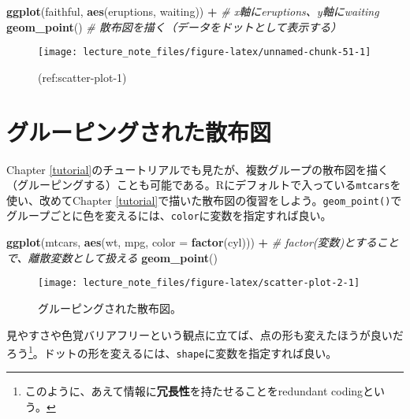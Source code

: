 \documentclass[]{book}
\newenvironment{Shaded}{\begin{snugshade}}{\end{snugshade}}
\newcommand{\KeywordTok}[1]{\textcolor[rgb]{0.13,0.29,0.53}{\textbf{#1}}}
\newcommand{\DataTypeTok}[1]{\textcolor[rgb]{0.13,0.29,0.53}{#1}}
\newcommand{\StringTok}[1]{\textcolor[rgb]{0.31,0.60,0.02}{#1}}
\newcommand{\CommentTok}[1]{\textcolor[rgb]{0.56,0.35,0.01}{\textit{#1}}}
\newcommand{\OperatorTok}[1]{\textcolor[rgb]{0.81,0.36,0.00}{\textbf{#1}}}
\newcommand{\NormalTok}[1]{#1}
\let\rmarkdownfootnote\footnote%
\def\footnote{\protect\rmarkdownfootnote}
\begin{document}
\begin{Shaded}
\begin{Highlighting}[]
\KeywordTok{ggplot}\NormalTok{(faithful, }\KeywordTok{aes}\NormalTok{(eruptions, waiting)) }\OperatorTok{+}\StringTok{ }\CommentTok{# x軸にeruptions、y軸にwaiting}
\StringTok{  }\KeywordTok{geom_point}\NormalTok{() }\CommentTok{# 散布図を描く（データをドットとして表示する）}
\end{Highlighting}
\end{Shaded}

\begin{figure}

{\centering \texttt{[image: lecture\_note\_files/figure-latex/unnamed-chunk-51-1]} 

}

\caption{(ref:scatter-plot-1)}\label{fig:unnamed-chunk-51}
\end{figure}

\section{グルーピングされた散布図}

Chapter
\ref{tutorial}のチュートリアルでも見たが、複数グループの散布図を描く（グルーピングする）ことも可能である。Rにデフォルトで入っている\texttt{mtcars}を使い、改めてChapter
\ref{tutorial}で描いた散布図の復習をしよう。\texttt{geom\_point()}でグループごとに色を変えるには、\texttt{color}に変数を指定すれば良い。



\begin{Shaded}
\begin{Highlighting}[]
\KeywordTok{ggplot}\NormalTok{(mtcars, }\KeywordTok{aes}\NormalTok{(wt, mpg, }\DataTypeTok{color =} \KeywordTok{factor}\NormalTok{(cyl))) }\OperatorTok{+}\StringTok{ }\CommentTok{# factor(変数)とすることで、離散変数として扱える}
\StringTok{  }\KeywordTok{geom_point}\NormalTok{()}
\end{Highlighting}
\end{Shaded}

\begin{figure}

{\centering \texttt{[image: lecture\_note\_files/figure-latex/scatter-plot-2-1]} 

}

\caption{グルーピングされた散布図。}\label{fig:scatter-plot-2}
\end{figure}

見やすさや色覚バリアフリーという観点に立てば、点の形も変えたほうが良いだろう\footnote{このように、あえて情報に\textbf{冗長性}を持たせることをredundant
  codingという。}。ドットの形を変えるには、\texttt{shape}に変数を指定すれば良い。
\end{document}
